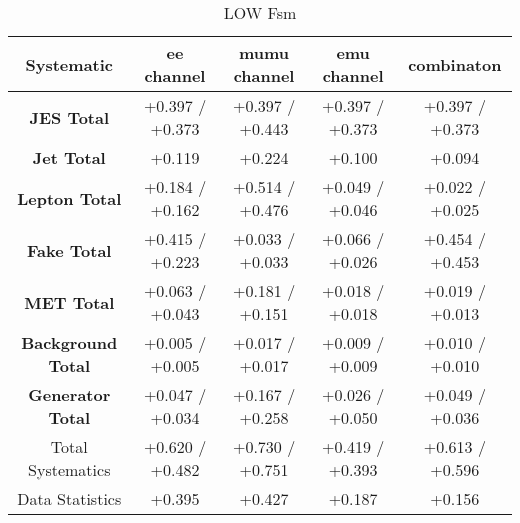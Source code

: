\begin{table}[htbp]
\scriptsize
  \begin{center} 
  \begin{tabular}{|c|c|c|c|c|}
  \hline
   Systematic                            &  ee channel&  mumu channel&  emu channel&  combinaton\\
 \hline
\textbf{JES Total}                    &+0.397   / +0.373   & +0.397   / +0.443   & +0.397   / +0.373   & +0.397   / +0.373  \\
\textbf{Jet Total}                    &+0.119              & +0.224              & +0.100              & +0.094             \\
\textbf{Lepton Total}                 &+0.184   / +0.162   & +0.514   / +0.476   & +0.049   / +0.046   & +0.022   / +0.025  \\
\textbf{Fake Total}                   &+0.415   / +0.223   & +0.033   / +0.033   & +0.066   / +0.026   & +0.454   / +0.453  \\
\textbf{MET Total}                    &+0.063   / +0.043   & +0.181   / +0.151   & +0.018   / +0.018   & +0.019   / +0.013  \\
\textbf{Background Total}             &+0.005   / +0.005   & +0.017   / +0.017   & +0.009   / +0.009   & +0.010   / +0.010  \\
\textbf{Generator Total}              &+0.047   / +0.034   & +0.167   / +0.258   & +0.026   / +0.050   & +0.049   / +0.036  \\
  \hline
  \hline
Total Systematics                     &+0.620   / +0.482   & +0.730   / +0.751   & +0.419   / +0.393   & +0.613   / +0.596  \\
Data Statistics                       &+0.395              & +0.427              & +0.187              & +0.156             \\
  \hline
  \end{tabular}
  \end{center} 
  \label{tab:fsm_nominal_coscos_op_low}
  \caption{\coscosop LOW Fsm}
\end{table}

